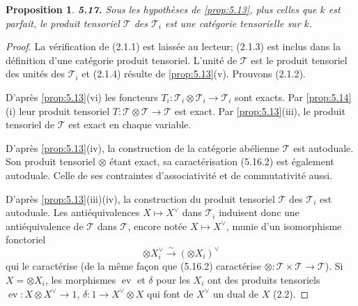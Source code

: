 \documentclass[12pt,a4paper]{article}
\theoremstyle{plain}
\newtheorem{proposition}[theorem]{Proposition}
\theoremstyle{definition}
\theoremstyle{remark}
\DeclareMathOperator{\ev}{ev}
\begin{document}
\begin{proposition}\label{prop:5.17}
\textbf{5.17.} Sous les hypothèses de \ref{prop:5.13}, plus celles que $k$ est parfait, le produit tensoriel $\mathcal{T}$ des $\mathcal{T}_i$ est une catégorie tensorielle sur $k$.
\end{proposition}

\begin{proof}
La vérification de (2.1.1) est laissée au lecteur; (2.1.3) est inclus dans la définition d'une catégorie produit tensoriel. L'unité de $\mathcal{T}$ est le produit tensoriel des unités des $\mathcal{T}_i$ et (2.1.4) résulte de \ref{prop:5.13}(v). Prouvons (2.1.2).

D'après \ref{prop:5.13}(vi) les foncteurs $T_i : \mathcal{T}_i \otimes \mathcal{T}_i \to \mathcal{T}_i$ sont exacts. Par \ref{prop:5.14}(i) leur produit tensoriel $T : \mathcal{T} \otimes \mathcal{T} \to \mathcal{T}$ est exact. Par \ref{prop:5.13}(iii), le produit tensoriel de $\mathcal{T}$ est exact en chaque variable.

D'après \ref{prop:5.13}(iv), la construction de la catégorie abélienne $\mathcal{T}$ est autoduale. Son produit tensoriel $\otimes$ étant exact, sa caractérisation (5.16.2) est également autoduale. Celle de ses contraintes d'associativité et de commutativité aussi.

D'après \ref{prop:5.13}(iii)(iv), la construction du produit tensoriel $\mathcal{T}$ des $\mathcal{T}_i$ est autoduale. Les antiéquivalences $X \mapsto X^\vee$ dans $\mathcal{T}_i$ induisent donc une antiéquivalence de $\mathcal{T}$ dans $\mathcal{T}$, encore notée $X \mapsto X^\vee$, munie d'un isomorphisme fonctoriel
\begin{equation}\label{eq:5.17.1}
\otimes X_i^\vee \xrightarrow{\sim} (\otimes X_i)^\vee
\end{equation}
qui le caractérise (de la même façon que (5.16.2) caractérise $\otimes : \mathcal{T} \times \mathcal{T} \to \mathcal{T}$). Si $X = \otimes X_i$, les morphismes $\ev$ et $\delta$ pour les $X_i$ ont des produits tensoriels $\ev : X \otimes X^\vee \to 1$, $\delta : 1 \to X^\vee \otimes X$ qui font de $X^\vee$ un dual de $X$ (2.2).


\end{proof}
\end{document}
